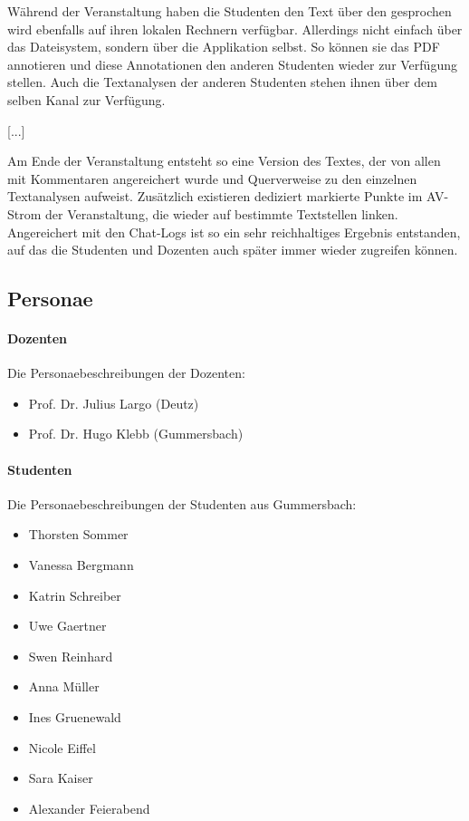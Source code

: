   Während der Veranstaltung haben die Studenten den Text über den gesprochen wird ebenfalls auf ihren lokalen Rechnern verfügbar. Allerdings nicht einfach über das Dateisystem, sondern über die Applikation selbst. So können sie das PDF annotieren und diese Annotationen den anderen Studenten wieder zur Verfügung stellen. Auch die Textanalysen der anderen Studenten stehen ihnen über dem selben Kanal zur Verfügung.
  
  [...]
  
  Am Ende der Veranstaltung entsteht so eine Version des Textes, der von allen mit Kommentaren angereichert wurde und Querverweise zu den einzelnen Textanalysen aufweist. Zusätzlich existieren dediziert markierte Punkte im AV-Strom der Veranstaltung, die wieder auf bestimmte Textstellen linken. Angereichert mit den Chat-Logs ist so ein sehr reichhaltiges Ergebnis entstanden, auf das die Studenten und Dozenten auch später immer wieder zugreifen können.
  
\subsection{Personae} %
\label{sub:personae}

\paragraph{Dozenten} %
\label{par:dozenten}

  Die Personaebeschreibungen der Dozenten:

  \begin{itemize}

  	\item Prof. Dr. Julius Largo (Deutz)
  	\item Prof. Dr. Hugo Klebb (Gummersbach)

  \end{itemize}


\paragraph{Studenten} %
\label{par:studenten}

  Die Personaebeschreibungen der Studenten aus Gummersbach:
  
  \begin{itemize}

  	\item   Thorsten Sommer
  	\item   Vanessa Bergmann
  	\item   Katrin Schreiber
  	\item   Uwe Gaertner
  	\item   Swen Reinhard
  	\item   Anna Müller
  	\item   Ines Gruenewald
  	\item   Nicole Eiffel
  	\item   Sara Kaiser
  	\item   Alexander Feierabend

  \end{itemize}
  
